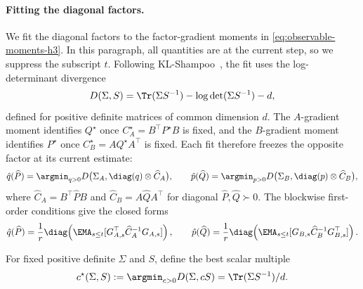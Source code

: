 \paragraph{Fitting the diagonal factors.}
We fit the diagonal factors to the factor-gradient moments in
\eqref{eq:observable-moments-h3}. In this paragraph, all quantities are
at the current step, so we suppress the subscript $t$. Following
KL-Shampoo~\cite{klshampoo}, the fit uses the log-determinant
divergence~\cite{logdetdiv}
\[
  D(\Sigma,S)=\Tr(\Sigma S^{-1})-\log\det(\Sigma S^{-1})-d,
\]
defined for positive definite matrices of common dimension $d$.
The $A$-gradient moment identifies $Q^\star$ once
$C^\star_A=B^\top P^\star B$ is fixed, and the $B$-gradient moment
identifies $P^\star$ once $C^\star_B=AQ^\star A^\top$ is fixed. Each fit
therefore freezes the opposite factor at its current estimate:
\begin{equation}\label{eq:factor-fit-h3}
  \hat{q}(\widehat P)
  =
  \argmin_{q>0}
  D\bigl(\Sigma_A,\diag(q)\otimes\widehat C_A\bigr),
  \qquad
  \hat{p}(\widehat Q)
  =
  \argmin_{p>0}
  D\bigl(\Sigma_B,\diag(p)\otimes\widehat C_B\bigr),
\end{equation}
where
$\widehat C_A=B^\top\widehat P B$ and
$\widehat C_B=A\widehat Q A^\top$ for diagonal
$\widehat P,\widehat Q\succ0$. The blockwise first-order conditions give
the closed forms
\[
  \hat{q}(\widehat P)
  =
  \frac1r\diag\!\left(
    \EMA_{s\le t}[G_{A,s}^\top\widehat C_A^{-1}G_{A,s}]
  \right),
  \qquad
  \hat{p}(\widehat Q)
  =
  \frac1r\diag\!\left(
    \EMA_{s\le t}[G_{B,s}\widehat C_B^{-1}G_{B,s}^\top]
  \right).
\]

For fixed positive definite $\Sigma$ and $S$, define the best scalar
multiple
\[
  c^\star(\Sigma,S)
  :=
  \argmin_{c>0}D(\Sigma,cS)
  =
  \Tr(\Sigma S^{-1})/d .
\]


